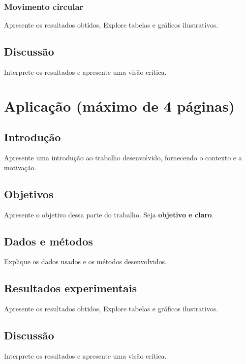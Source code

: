 \documentclass{article}
\begin{document}
\subsubsection{Movimento circular}

Apresente os resultados obtidos, Explore tabelas e gráficos ilustrativos.

\subsection{Discussão}

Interprete os resultados e apresente uma visão crítica.

\newpage

\section{Aplicação (máximo de 4 páginas)}

\subsection{Introdução}

Apresente uma introdução ao trabalho desenvolvido, fornecendo o contexto e a motivação.

\subsection{Objetivos}

Apresente o objetivo dessa parte do trabalho. Seja {\bf objetivo e claro}.

\subsection{Dados e métodos}

Explique os dados usados e os métodos desenvolvidos.

\subsection{Resultados experimentais}

Apresente os resultados obtidos, Explore tabelas e gráficos ilustrativos.

\subsection{Discussão}

Interprete os resultados e apresente uma visão crítica.
\end{document}
